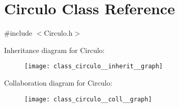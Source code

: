 \hypertarget{class_circulo}{\section{Circulo Class Reference}
\label{class_circulo}
}


{\ttfamily \#include $<$Circulo.\+h$>$}



Inheritance diagram for Circulo\+:
\nopagebreak
\begin{figure}[H]
\begin{center}
\leavevmode
\texttt{[image: class\_circulo\_\_inherit\_\_graph]}
\end{center}
\end{figure}


Collaboration diagram for Circulo\+:
\nopagebreak
\begin{figure}[H]
\begin{center}
\leavevmode
\texttt{[image: class\_circulo\_\_coll\_\_graph]}
\end{center}
\end{figure}

